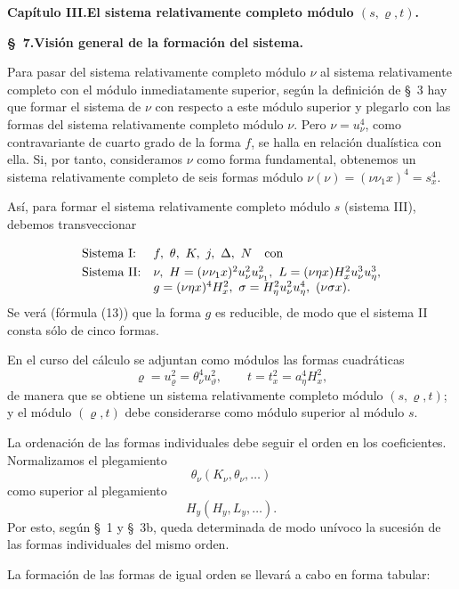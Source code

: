 \documentclass[11pt]{article}
\newcommand{\A}{\Delta}
\begin{document}
\begin{center}
{\Large\bfseries Capítulo III.\quad El sistema relativamente completo módulo $(s,\varrho,t)$.}
\end{center}

\begin{center}
\textbf{\S\ 7.\quad Visión general de la formación del sistema.}
\end{center}

Para pasar del sistema relativamente completo módulo $\nu$ al sistema relativamente completo con el módulo inmediatamente superior, según la definición de \S\ 3 hay que formar el sistema de $\nu$ con respecto a este módulo superior y plegarlo con las formas del sistema relativamente completo módulo $\nu$. Pero $\nu=u_\nu^4$, como contravariante de cuarto grado de la forma $f$, se halla en relación dualística con ella. Si, por tanto, consideramos $\nu$ como forma fundamental, obtenemos un sistema relativamente completo de seis formas módulo $\nu(\nu)=(\nu\nu_1x)^4=s_x^4$.

Así, para formar el sistema relativamente completo módulo $s$ (sistema III), debemos transveccionar
\[
\begin{array}{ll}
\text{Sistema I:} & f,\ \theta,\ K,\ j,\ \A,\ N\quad \text{con}\vphantom{\dfrac11}\\[0.3em]
\text{Sistema II:} & \nu,\ H=(\nu\nu_1x)^2u_\nu^2u_{\nu_1}^2,\ L=(\nu\eta x)H_x^2u_\nu^3u_\eta^3,\\
& g=(\nu\eta x)^4H_x^2,\ \sigma=H_\eta^2u_\nu^2u_\eta^4,\ (\nu\sigma x).
\end{array}
\]
Se verá (fórmula (13)) que la forma $g$ es reducible, de modo que el sistema II consta sólo de cinco formas.

En el curso del cálculo se adjuntan como módulos las formas cuadráticas
\[
\varrho=u_\varrho^2=\theta_\nu^4u_\vartheta^2,
\qquad
 t=t_x^2=a_\eta^4H_x^2,
\]
de manera que se obtiene un sistema relativamente completo módulo $(s,\varrho,t)$; y el módulo $(\varrho,t)$ debe considerarse como módulo superior al módulo $s$.

La ordenación de las formas individuales debe seguir el orden en los coeficientes. Normalizamos el plegamiento
\[
\theta_\nu(K_\nu,\theta_\nu,\ldots)
\]
como superior al plegamiento
\[
H_y(H_y,L_y,\ldots).
\]
Por esto, según \S\ 1 y \S\ 3b, queda determinada de modo unívoco la sucesión de las formas individuales del mismo orden.

La formación de las formas de igual orden se llevará a cabo en forma tabular:
\end{document}
